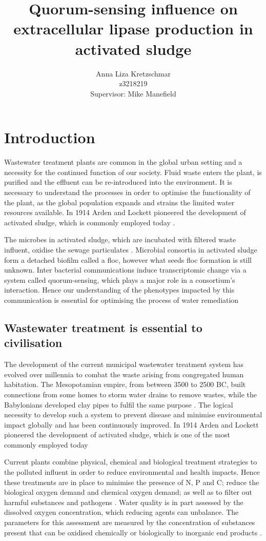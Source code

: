 \documentclass[11pt]{article}
\title{\textbf{Quorum-sensing influence on extracellular lipase production in activated sludge}}
\author{Anna Liza Kretzschmar\\
        z3218219\\
        Supervisor: Mike Manefield}
\date{}
\begin{document}
\maketitle

\section{Introduction}
Wastewater treatment plants are common in the global urban setting and a necessity for the continued function of our society. Fluid waste enters the plant, is purified and the effluent can be re-introduced into the environment. It is necessary to understand the processes in order to optimise the functionality of the plant, as the global population expands and strains the limited water resources available. In 1914 Arden and Lockett pioneered the development of activated sludge, which is commonly employed today \cite{ardern1914experiments}.


The microbes in activated sludge, which are incubated with filtered waste influent, oxidise the sewage particulates \cite{Price_95}. Microbial consortia in activated sludge form a detached biofilm called a floc, however what seeds floc formation is still unknown. Inter bacterial communications induce transcriptomic change via a system called quorum-sensing, which plays a major role in a consortium's interaction\cite{parsek2005sociomicrobiology}. Hence our understanding of the phenotypes impacted by this communication is essential for optimising the process of water remediation \cite{singh2006biofilms}

\subsection{Wastewater treatment is essential to civilisation}
The development of the current municipal wastewater treatment system has evolved over millennia to combat the waste arising from congregated human habitation. The Mesopotamian empire, from between 3500 to 2500 BC, built connections from some homes to storm water drains to remove wastes, while the Babylonians developed clay pipes to fulfil the same purpose \cite{lofrano2010}. The logical necessity to develop such a system to prevent disease and minimise environmental impact globally and has been continuously improved. In 1914 Arden and Lockett pioneered the development of activated sludge, which is one of the most commonly employed today \cite{jenkins2004manual,muchie2010bioremediation}


Current plants combine physical, chemical and biological treatment strategies to the polluted influent in order to reduce environmental and health impacts. Hence these treatments are in place to minimise the presence of N, P and C; reduce the biological oxygen demand and chemical oxygen demand; as well as to filter out harmful substances and pathogens \cite{mayhew1997low}.
Water quality is in part assessed by the dissolved oxygen concentration, which reducing agents can unbalance. The parameters for this assessment are measured by the concentration of substances present that can be oxidised chemically or biologically to inorganic end products \cite{pisarevsky2005chemical}.
\end{document}
